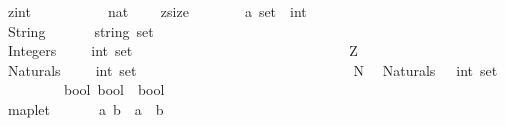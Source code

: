 \begin{isabellebody}
\ \ {\isachardoublequoteopen}zint{\isachardoublequoteclose}\ \ \ \ \ \ \ \ \ \ {\isacharequal}{\isacharequal}\ {\isachardoublequoteopen}nat{\isachardoublequoteclose}\ \ \isanewline
\isanewline
\isanewline
{}\isamarkupfalse%
\isanewline
\ \ zsize\ \ \ \ \ \ \ \ {\isacharcolon}{\isacharcolon}{\isachardoublequoteopen}{\isacharparenleft}{\isacharprime}a\ set{\isacharparenright}\ {\isacharequal}{\isachargreater}\ int{\isachardoublequoteclose}\ \ \ \ \ \ \ \ \ \ \ \ \ \ \ \ \ \ \ \ \ \ \ {\isacharparenleft}{\isachardoublequoteopen}{\isacharhash}{\isachardoublequoteclose}\ {\isacharparenright}\isanewline
\ \ String\ \ \ \ \ \ \ {\isacharcolon}{\isacharcolon}{\isachardoublequoteopen}string\ set{\isachardoublequoteclose}\isanewline
\ \ Integers\ \ \ \ \ {\isacharcolon}{\isacharcolon}{\isachardoublequoteopen}int\ set{\isachardoublequoteclose}\ \ \ \ \ \ \ \ \ \ \ \ \ \ \ \ \ \ \ \ \ \ \ \ \ \ \ \ \ \ \ {\isacharparenleft}{\isachardoublequoteopen}{\isacharpercent}Z{\isachardoublequoteclose}{\isacharparenright}\isanewline
\ \ Naturals\ \ \ \ \ {\isacharcolon}{\isacharcolon}{\isachardoublequoteopen}int\ set{\isachardoublequoteclose}\ \ \ \ \ \ \ \ \ \ \ \ \ \ \ \ \ \ \ \ \ \ \ \ \ \ \ \ \ \ \ {\isacharparenleft}{\isachardoublequoteopen}{\isacharpercent}N{\isachardoublequoteclose}{\isacharparenright}\isanewline
\ \ Naturals{\isacharunderscore}{}\ \ \ {\isacharcolon}{\isacharcolon}{\isachardoublequoteopen}int\ set{\isachardoublequoteclose}\isanewline
\ \ {\isachardoublequoteopen}{\isacharless}{\isacharminus}{\isachargreater}{\isachardoublequoteclose}\ \ \ \ \ \ \ \ {\isacharcolon}{\isacharcolon}{\isachardoublequoteopen}{\isacharbrackleft}bool{\isacharcomma}\ bool{\isacharbrackright}\ {\isacharequal}{\isachargreater}\ bool{\isachardoublequoteclose}\ \ \ \ \ \ \ \ \ \ \ \ \ \ \ \ \ \ {\isacharparenleft}\ {}{}{\isacharparenright}\isanewline
\ \ maplet\ \ \ \ \ \ \ {\isacharcolon}{\isacharcolon}{\isachardoublequoteopen}{\isacharbrackleft}{\isacharprime}a{\isacharcomma}\ {\isacharprime}b{\isacharbrackright}\ {\isacharequal}{\isachargreater}\ {\isacharparenleft}{\isacharprime}a\ {\isacharasterisk}\ {\isacharprime}b{\isacharparenright}{\isachardoublequoteclose}\ \ \ \ \ \ \ \ \ \ \ \ \ \ \ \ \ {\isacharparenleft}{\isachardoublequoteopen}{\isacharparenleft}{}{\isacharunderscore}\ {\isasymbar}{\isacharminus}{\isacharminus}{\isachargreater}{\isacharslash}\ {\isacharunderscore}{\isacharparenright}{\isachardoublequoteclose}\ {\isacharbrackleft}{}{}{\isacharcomma}{}{}{\isacharbrackright}\ {}{}{\isacharparenright}\ \isanewline

\end{isabellebody}
